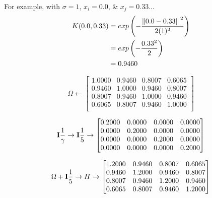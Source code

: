 For example, with $\sigma=1$, $x_i=0.0$, \& $x_j = 0.33\dots$
\begin{equation}
        \begin{split}
                K(0.0,0.33) & = exp\left(-\frac{\norm*{0.0-0.33}^2}{2(1)^2}\right) \\
                & = exp\left(-\frac{0.33^2}{2}\right) \\
                & = 0.9460
        \end{split}
\end{equation}

\begin{equation}
        \Omega\gets
        \begin{bmatrix}
                1.0000 & 0.9460 & 0.8007 & 0.6065 \\
                0.9460 & 1.0000 & 0.9460 & 0.8007 \\
                0.8007 & 0.9460 & 1.0000 & 0.9460 \\
                0.6065 & 0.8007 & 0.9460 & 1.0000 \\
        \end{bmatrix}
\end{equation}

\begin{equation}
        \vb{I}\frac{1}{\gamma}\to\vb{I}\frac{1}{5}\to
        \begin{bmatrix}
                0.2000 & 0.0000 & 0.0000 & 0.0000 \\
                0.0000 & 0.2000 & 0.0000 & 0.0000 \\
                0.0000 & 0.0000 & 0.2000 & 0.0000 \\
                0.0000 & 0.0000 & 0.0000 & 0.2000
        \end{bmatrix}
\end{equation}

\begin{equation}
        \Omega+\vb{I}\frac{1}{5}\to H\to \begin{bmatrix}
                1.2000 & 0.9460 & 0.8007 & 0.6065 \\
                0.9460 & 1.2000 & 0.9460 & 0.8007 \\
                0.8007 & 0.9460 & 1.2000 & 0.9460 \\
                0.6065 & 0.8007 & 0.9460 & 1.2000 \\
        \end{bmatrix}
\end{equation}

